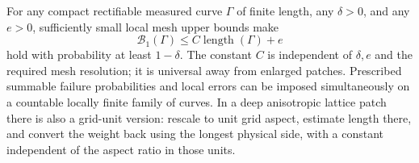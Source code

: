 \begin{lemma}
\label{lt:curve-probability}
For any compact rectifiable measured curve $\Gamma$ of finite
length, any $\delta>0$, and any $e>0$, sufficiently small local
mesh upper bounds make
\begin{equation}
 \mathcal B_1(\Gamma)\leq C\operatorname{length}(\Gamma)+e
 \label{lt:curve-high-probability}
\end{equation}
hold with probability at least $1-\delta$.  The constant $C$ is
independent of $\delta,e$ and the required mesh resolution; it is
universal away from enlarged patches.  Prescribed summable failure
probabilities and local errors can be imposed simultaneously on a
countable locally finite family of curves.  In a deep anisotropic
lattice patch there is also a grid-unit version: rescale to unit
grid aspect, estimate length there, and convert the weight back
using the longest physical side, with a constant independent of
the aspect ratio in those units.
\end{lemma}


